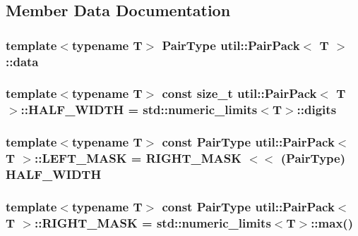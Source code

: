 \subsection{Member Data Documentation}
\hypertarget{structutil_1_1PairPack_aec1cdcd3f1e2925b16cc352740e0062d}{
\subsubsection[{data}]{\setlength{\rightskip}{0pt plus 5cm}template$<$typename T$>$ {\bf Pair\-Type} {\bf util\-::\-Pair\-Pack}$<$ T $>$\-::data}}\label{structutil_1_1PairPack_aec1cdcd3f1e2925b16cc352740e0062d}
\hypertarget{structutil_1_1PairPack_a82b7f172ee421baa22504dcc01aa7263}{
\subsubsection[{H\-A\-L\-F\-\_\-\-W\-I\-D\-T\-H}]{\setlength{\rightskip}{0pt plus 5cm}template$<$typename T$>$ const size\-\_\-t {\bf util\-::\-Pair\-Pack}$<$ T $>$\-::H\-A\-L\-F\-\_\-\-W\-I\-D\-T\-H = std\-::numeric\-\_\-limits$<$T$>$\-::digits\hspace{0.3cm}{\ttfamily [static]}}}\label{structutil_1_1PairPack_a82b7f172ee421baa22504dcc01aa7263}
\hypertarget{structutil_1_1PairPack_a87a1f72957290f5c965d55474a359d1a}{
\subsubsection[{L\-E\-F\-T\-\_\-\-M\-A\-S\-K}]{\setlength{\rightskip}{0pt plus 5cm}template$<$typename T$>$ const {\bf Pair\-Type} {\bf util\-::\-Pair\-Pack}$<$ T $>$\-::L\-E\-F\-T\-\_\-\-M\-A\-S\-K = {\bf R\-I\-G\-H\-T\-\_\-\-M\-A\-S\-K} $<$$<$ ({\bf Pair\-Type}) {\bf H\-A\-L\-F\-\_\-\-W\-I\-D\-T\-H}\hspace{0.3cm}{\ttfamily [static]}}}\label{structutil_1_1PairPack_a87a1f72957290f5c965d55474a359d1a}
\hypertarget{structutil_1_1PairPack_adac60467f205f05a29071c7e79d8cb2b}{
\subsubsection[{R\-I\-G\-H\-T\-\_\-\-M\-A\-S\-K}]{\setlength{\rightskip}{0pt plus 5cm}template$<$typename T$>$ const {\bf Pair\-Type} {\bf util\-::\-Pair\-Pack}$<$ T $>$\-::R\-I\-G\-H\-T\-\_\-\-M\-A\-S\-K = std\-::numeric\-\_\-limits$<$T$>$\-::max()\hspace{0.3cm}{\ttfamily [static]}}}\label{structutil_1_1PairPack_adac60467f205f05a29071c7e79d8cb2b}


